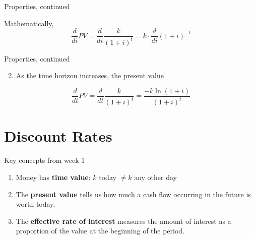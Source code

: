 \documentclass{beamer}
\begin{document}
\begin{frame}{Properties, continued}

Mathematically,
\[
\frac{d}{di} PV = \frac{d}{di} \frac{k}{(1+i)^t} = k \cdot \frac{d}{di}(1+i)^{-t}
\]

\vfill
\end{frame}

\begin{frame}{Properties, continued}

\begin{enumerate}
\setcounter{enumi}{1}
\item As the time horizon increases, the present value
\end{enumerate}

\begin{center}
\end{center}

\vfill
\[
\frac{d}{dt} PV = \frac{d}{dt} \frac{k}{(1+i)^t} = \frac{-k \ln(1+i)}{(1+i)^t}
\]

\end{frame}

\section{Discount Rates}

\begin{frame}{Key concepts from week 1}

\begin{enumerate}
\item Money has \textbf{time value}: $k$ today $\neq k$ any other day
\bigskip
\item The \textbf{present value} tells us how much a cash flow occurring in the future is worth today.
\bigskip
\item The \textbf{effective rate of interest} measures the amount of interest as a proportion of the value at the beginning of the period.
\end{enumerate}

\end{frame}

\newcommand{\cashflow}[3]{%
  \begin{tikzpicture}
    \node[anchor=west] at (-2,0.5) {\scriptsize Borrow:};
    \node[anchor=west] at (-2,-0.5) {\scriptsize Pay:};
    \draw (0,0) -- (5,0);
    \draw (0,0.12) -- (0,-0.12);
    \draw (5,0.12) -- (5,-0.12);
    \node at (0,0.5) {\scriptsize #1};
    \node at (0,-0.5) {\scriptsize #2};
    \node at (5,-0.5) {\scriptsize #3};
  \end{tikzpicture}%
}
\end{document}
